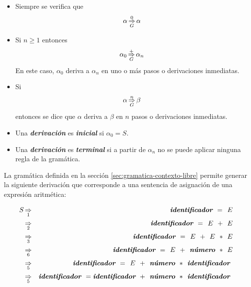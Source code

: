 \begin{itemize}
\item Siempre se verifica que 
\begin{equation}
 \alpha \mathop{\Rightarrow}\limits^0_G \alpha
\end{equation}
\item Si $n \geq 1$ entonces 
\begin{equation}
 \alpha_0 \mathop{\Rightarrow}\limits^+_G \alpha_n
\end{equation}
En este caso, $\alpha_0$ deriva a $\alpha_n$ en uno o m\'as pasos o derivaciones inmediatas.
\item Si 
\begin{equation}
 \alpha \mathop{\Rightarrow}\limits^n_G \beta
\end{equation}
entonces se dice que $\alpha$ deriva a $\beta$ en $n$ pasos o derivaciones inmediatas.
\item Una {\bf\em derivación} es {\bf\em inicial} si $\alpha_0 = S$.
\item Una {\bf\em derivación} es {\bf\em terminal} si a partir de $\alpha_n$  no se puede aplicar ninguna regla de la gramática.
\end{itemize}


La gramática definida en la sección \ref{sec:gramatica-contexto-libre} permite generar la siguiente derivación que corresponde a una sentencia de asignación de una expresión aritmética:

\begin{eqnarray*}
  S  & \mathop{\Rightarrow}\limits_1 & \mbox{\bf\em identificador } = \hspace{1ex} E \\
     & \mathop{\Rightarrow}\limits_2 & \mbox{\bf\em identificador } = \hspace{1ex} E \hspace{1ex} + \hspace{1ex} E \\
     & \mathop{\Rightarrow}\limits_3 & \mbox{\bf\em identificador } = \hspace{1ex} E \hspace{1ex} + \hspace{1ex} E \hspace{1ex} * \hspace{1ex} E \\
     & \mathop{\Rightarrow}\limits_6 & \mbox{\bf\em identificador } = \hspace{1ex} E \hspace{1ex} + \hspace{1ex} \mbox{\bf\em número } * \hspace{1ex} E \\
     & \mathop{\Rightarrow}\limits_5 & \mbox{\bf\em identificador } = \hspace{1ex} E \hspace{1ex} + \hspace{1ex} \mbox{\bf\em número } * \hspace{1ex} \mbox{\bf\em identificador }  \\
     & \mathop{\Rightarrow}\limits_5 & \mbox{\bf\em identificador } = \mbox{\bf\em identificador } + \hspace{1ex} \mbox{\bf\em número } * \hspace{1ex} \mbox{\bf\em identificador } 
\end{eqnarray*}

